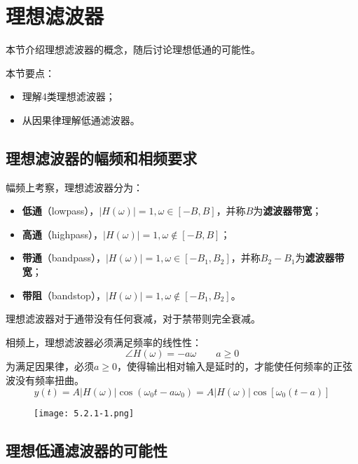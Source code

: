 \section{理想滤波器}

本节介绍理想滤波器的概念，随后讨论理想低通的可能性。

本节要点：
\begin{itemize}
    \item 理解4类理想滤波器；
    \item 从因果律理解低通滤波器。
\end{itemize}

\subsection{理想滤波器的幅频和相频要求}

幅频上考察，理想滤波器分为：
\begin{itemize}
    \item {\bf 低通}（lowpass），$\left| H\left( \omega \right) \right|=1,\omega \in \left[ -B,B \right] $，并称$B$为{\bf 滤波器带宽}；
    \item {\bf 高通}（highpass），$\left| H\left( \omega \right) \right|=1,\omega \notin \left[ -B,B \right] $；
    \item {\bf 带通}（bandpass），$\left| H\left( \omega \right) \right|=1,\omega \in \left[ -B_1,B_2 \right] $，并称$B_2-B_1$为{\bf 滤波器带宽}；
    \item {\bf 带阻}（bandstop），$\left| H\left( \omega \right) \right|=1,\omega \notin \left[ -B_1,B_2 \right] $。
\end{itemize}
理想滤波器对于通带没有任何衰减，对于禁带则完全衰减。

相频上，理想滤波器必须满足频率的线性性：
\[
\angle H\left( \omega \right) =-a\omega \qquad a\geqslant 0
\]
为满足因果律，必须$a\geqslant 0$，使得输出相对输入是延时的，才能使任何频率的正弦波没有频率扭曲。
\[
y\left( t \right) =A\left| H\left( \omega \right) \right|\cos \left( \omega _0t-a\omega _0 \right) =A\left| H\left( \omega \right) \right|\cos \left[ \omega _0\left( t-a \right) \right]
\]
\begin{figure}[h]
\centering
\texttt{[image: 5.2.1-1.png]}
\end{figure}

\subsection{理想低通滤波器的可能性}

